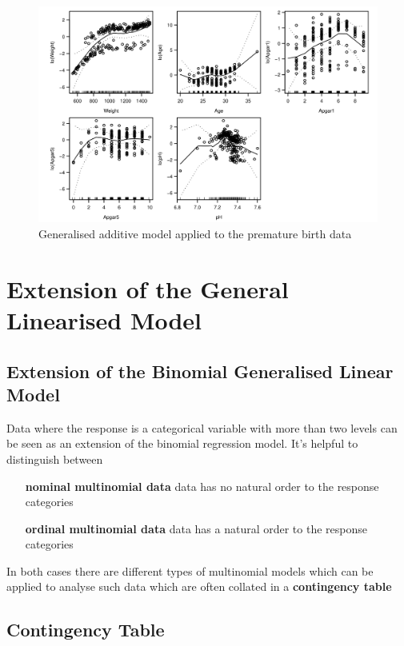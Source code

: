 \documentclass[11pt]{article}
\begin{document}
\begin{figure}[tbh]
	\centering
	\includegraphics[width=0.8\linewidth, keepaspectratio]{gam_graphical_analysis}
	\caption{Generalised additive model applied to the premature birth data}
	\label{fig:gamgraphicalanalysis}
\end{figure}

\section{Extension of the General Linearised Model}

\subsection{Extension of the Binomial Generalised Linear Model}

Data where the response is a categorical variable with more than two levels can be seen as an extension of the binomial regression model. It's helpful to distinguish between

\noindent
\begin{itemize}[leftmargin=*, labelindent=5cm, labelsep=0.5cm]
	\item[\textbf{nominal multinomial data}] data has no natural order to the response categories
	\item[\textbf{ordinal multinomial data}] data has a natural order to the response categories
\end{itemize}

In both cases there are different types of multinomial models which can be applied to analyse such data which are often collated in a \textbf{contingency table}

\subsection{Contingency Table}
\end{document}
